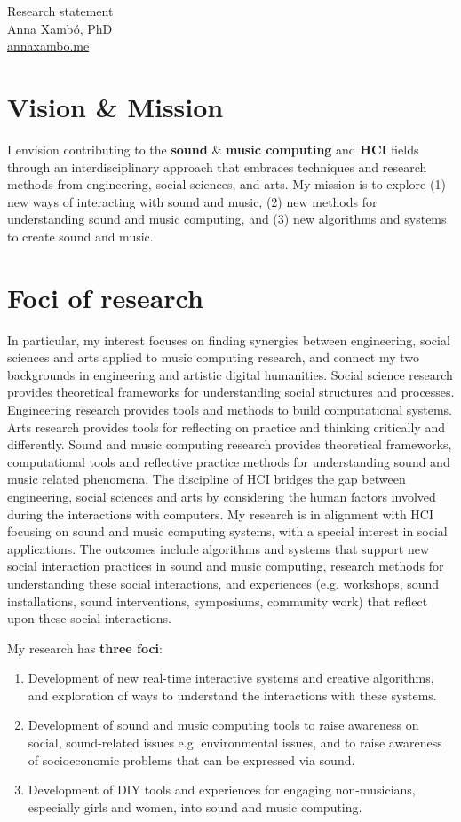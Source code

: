 \documentclass[10pt, a4paper]{article}
\begin{document}
{\LARGE Research statement}\\[0.2cm]
Anna Xambó, PhD\\
\href{http://annaxambo.me}{annaxambo.me}

\section*{Vision \& Mission}

I envision contributing to the \textbf{sound} \& \textbf{music computing} and \textbf{HCI} fields through an interdisciplinary approach that embraces techniques and research methods from engineering, social sciences, and arts.
My mission is to explore (1) new ways of interacting with sound and music, (2) new methods for understanding sound and music computing, and (3) new algorithms and systems to create sound and music. 

\section*{Foci of research}

In particular, my interest focuses on finding synergies between engineering, social sciences and arts applied to music computing research, and connect my two backgrounds in engineering and artistic digital humanities. Social science research provides theoretical frameworks for understanding social structures and processes. Engineering research provides tools and methods to build computational systems. Arts research provides tools for reflecting on practice and thinking critically and differently. Sound and music computing research provides theoretical frameworks, computational tools and reflective practice methods for understanding sound and music related phenomena. The discipline of HCI bridges the gap between engineering, social sciences and arts by considering the human factors involved during the interactions with computers. My research is in alignment with HCI focusing on sound and music computing systems, with a special interest in social applications. The outcomes include algorithms and systems that support new social interaction practices in sound and music computing, research methods for understanding these social interactions, and experiences (e.g. workshops, sound installations, sound interventions, symposiums, community work) that reflect upon these social interactions.

My research has \textbf{three foci}:

\begin{enumerate}
\item Development of new real-time interactive systems and creative algorithms, and exploration of ways to understand the interactions with these systems. 
\item Development of sound and music computing tools to raise awareness on social, sound-related issues e.g. environmental issues, and to raise awareness of socioeconomic problems that can be expressed via sound. 
\item Development of DIY tools and experiences for engaging non-musicians, especially girls and women, into sound and music computing.
\end{enumerate}
\end{document}
